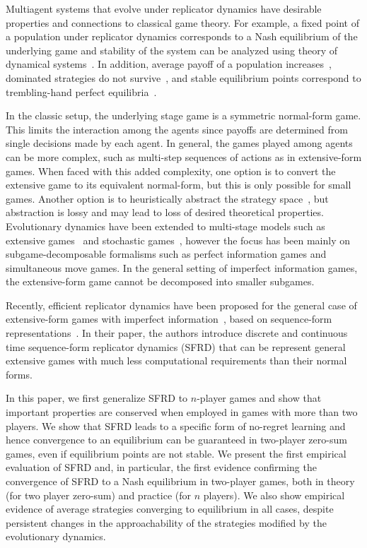 \documentclass{aamas2014}
\begin{document}
Multiagent systems that evolve under replicator dynamics have desirable properties and connections to classical game theory. 
For example, a fixed point of a population under replicator dynamics corresponds to a Nash equilibrium of the underlying  
game and stability of the system can be analyzed using theory of dynamical systems~\cite{FudLev98,Gintis09}. 
In addition, average payoff of a population increases~\cite{HS98}, dominated strategies do not survive~\cite{Gintis09}, and 
stable equilibrium points correspond to trembling-hand perfect equilibria~\cite{FudLev98,ShoLB08}.

In the classic setup, the underlying stage game is a symmetric normal-form game. This limits the interaction
among the agents since payoffs are determined from single decisions made by each agent. In general, the games played among agents 
can be more complex, such as multi-step sequences of actions as in extensive-form games. 
When faced with this added complexity, one option is to convert the extensive game to its equivalent normal-form, 
but this is only possible for small games. 
Another option is to heuristically abstract the strategy space~\cite{ponsen09b}, but 
abstraction is lossy and may lead to loss of desired theoretical properties.
Evolutionary dynamics have been extended to 
multi-stage models such as extensive games~\cite{Cressman03} and stochastic games~\cite{Flesch13Evolutionary,Hennes09State}, 
however the focus has been mainly on subgame-decomposable formalisms such as perfect information games and
simultaneous move games. In the general setting of imperfect information games, the extensive-form game cannot be 
decomposed into smaller subgames. 

Recently, efficient replicator dynamics have been proposed for the general case of extensive-form games with 
imperfect information~\cite{Gatti13Efficient}, based on sequence-form representations~\cite{SequenceFormLPs}. 
In their paper, the authors introduce discrete and continuous time sequence-form replicator dynamics (SFRD)
that can be represent general extensive games with much less computational requirements than their 
normal forms. 

In this paper, we first generalize SFRD to $n$-player games and 
show that important properties are conserved when employed in games with more than two players. 
We show that SFRD leads to a specific form of no-regret learning and hence convergence to an 
equilibrium can be guaranteed in two-player zero-sum games, even if equilibrium points are not stable. 
We present the first empirical evaluation of SFRD and, in particular, the first evidence confirming the convergence 
of SFRD to a Nash equilibrium in two-player games, both in theory (for two player zero-sum) and practice (for $n$ players).
We also show empirical evidence of average strategies converging to equilibrium in all cases, despite persistent  
changes in the approachability of the strategies modified by the evolutionary dynamics. 
\end{document}
